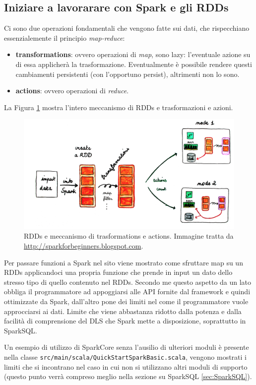 \documentclass[12pt,italian]{article}
\begin{document}
\subsection{Iniziare a lavorarare con Spark e gli RDDs}
Ci sono due operazioni fondamentali che vengono fatte sui dati, che rispecchiano essenzialemente il principio \textit{map-reduce}:
\begin{itemize}
	\item \textbf{transformations}: ovvero operazioni di \textit{map}, sono lazy: l'eventuale azione su di essa applicherà la trasformazione. Eventualmente è possibile rendere questi cambiamenti persistenti (con l'opportuno persist), altrimenti non lo sono.
	\item \textbf{actions}\label{sec:actions}: ovvero operazioni di \textit{reduce}.
\end{itemize}
La Figura \ref{fig:RDDs} mostra l'intero meccanismo di RDDs e trasformazioni e azioni.
\begin{figure}
	\centering 
	\includegraphics[width=1\linewidth]{img/rdds.png}
	\caption{RDDs e meccanismo di trasformations e actions. Immagine tratta da \url{http://sparkforbeginners.blogspot.com}.}
	\label{fig:RDDs}
\end{figure}
\par Per passare funzioni a Spark nel sito viene mostrato come sfruttare map su un RDDs applicandoci una propria funzione che prende in input un dato dello stresso tipo di quello contenuto nel RDDs. Secondo me questo aspetto da un lato obbliga il programmatore ad appoggiarsi alle API fornite dal framework e quindi ottimizzate da Spark, dall'altro pone dei limiti nel come il programmatore vuole approcciarsi ai dati. Limite che viene abbastanza ridotto dalla potenza e dalla facilità di comprensione del DLS che Spark mette a disposizione, soprattutto in SparkSQL.
\par Un esempio di utilizzo di SparkCore senza l'ausilio di ulteriori moduli è presente nella classe \texttt{src/main/scala/QuickStartSparkBasic.scala}, vengono mostrati i limiti che si incontrano nel caso in cui non si utilizzano altri moduli di supporto (questo punto verrà compreso meglio nella sezione su SparkSQL \ref{sec:SparkSQL}).
\end{document}

